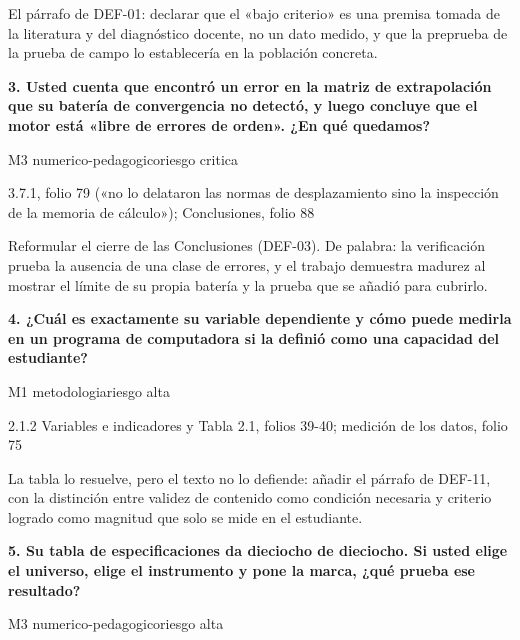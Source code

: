 {\small{}El párrafo de DEF-01: declarar que el «bajo criterio» es una premisa tomada de la literatura y del diagnóstico docente, no un dato medido, y que la preprueba de la prueba de campo lo establecería en la población concreta.\par}
\vspace{5pt}
\noindent\casilla\textbf{3. Usted cuenta que encontró un error en la matriz de extrapolación que su batería de convergencia no detectó, y luego concluye que el motor está «libre de errores de orden». ¿En qué quedamos?}\par
{\small\color{gris}\sffamily M3 numerico-pedagogico\quad{}\quad riesgo critica}\par
{\small{}3.7.1, folio 79 («no lo delataron las normas de desplazamiento sino la inspección de la memoria de cálculo»); Conclusiones, folio 88\par}
{\small{}Reformular el cierre de las Conclusiones (DEF-03). De palabra: la verificación prueba la ausencia de una clase de errores, y el trabajo demuestra madurez al mostrar el límite de su propia batería y la prueba que se añadió para cubrirlo.\par}
\vspace{5pt}
\noindent\casilla\textbf{4. ¿Cuál es exactamente su variable dependiente y cómo puede medirla en un programa de computadora si la definió como una capacidad del estudiante?}\par
{\small\color{gris}\sffamily M1 metodologia\quad{}\quad riesgo alta}\par
{\small{}2.1.2 Variables e indicadores y Tabla 2.1, folios 39-40; medición de los datos, folio 75\par}
{\small{}La tabla lo resuelve, pero el texto no lo defiende: añadir el párrafo de DEF-11, con la distinción entre validez de contenido como condición necesaria y criterio logrado como magnitud que solo se mide en el estudiante.\par}
\vspace{5pt}
\noindent\casilla\textbf{5. Su tabla de especificaciones da dieciocho de dieciocho. Si usted elige el universo, elige el instrumento y pone la marca, ¿qué prueba ese resultado?}\par
{\small\color{gris}\sffamily M3 numerico-pedagogico\quad{}\quad riesgo alta}\par

